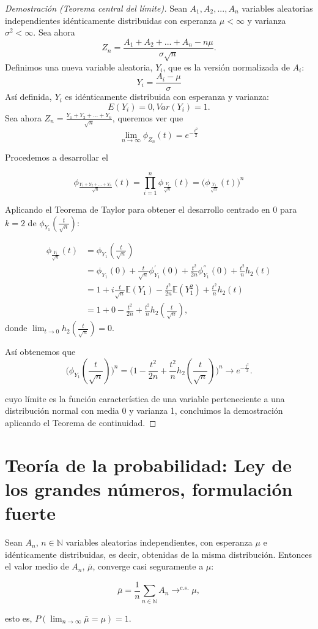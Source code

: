 \documentclass[../proyecto.tex]{memoir}
\begin{document}
\begin{proof}[Demostración (Teorema central del límite)]

Sean $A_{1},A_{2},...,A_{n}$ variables aleatorias independientes idénticamente distribuidas con esperanza $\mu < \infty$ y varianza $\sigma^2< \infty$.
Sea ahora $$
Z_{n} = \frac{A_{1}+A_{2}+...+A_{n}-n\mu }{\sigma \sqrt{n}}.
$$
Definimos una nueva variable aleatoria, $Y_i$, que es la versión normalizada de $A_i$:$$
Y_i=\frac{A_i-\mu}{\sigma}
$$
Así definida, $Y_i$ es idénticamente distribuida con esperanza y varianza: $$
E(Y_{i}) = 0,  Var(Y_{i})=1.
$$
Sea ahora $Z_n = \frac{Y_1+Y_2+...+Y_n}{\sqrt{n}}$, queremos ver que $$
\lim_{n \to \infty} \phi_{Z_{n}}(t)=e^{-\frac{t^{2}}{2}}
$$

Procedemos a desarrollar el

$$
\phi_{\frac{Y_1+Y_2+...+Y_n}{\sqrt{n}}}(t) = \prod_{i=1}^{n} \phi_{\frac{Y_i}{\sqrt{n}}} (t) = \big(\phi_{\frac{Y_1}{\sqrt{n}}}(t) \big)^n
$$

Aplicando el Teorema de Taylor para obtener el desarrollo centrado en 0 para $k=2$ de $\phi_{Y_1}(\frac{t}{\sqrt{n}})$: 

\begin{align*}
\phi_{\frac{Y_1}{\sqrt{n}}}(t) &= \phi_{Y_1}(\frac{t}{\sqrt{n}}) \\
  &= \phi_{Y_1}(0) + \frac{t}{\sqrt{n}}\phi_{Y_1}^{'}(0) + \frac{t^2}{2n}\phi_{Y_1}^{''}(0) + \frac{t^2}{n} h_2(t)\\
 &= 1 + i\frac{t}{\sqrt{n}}\mathds{E}(Y_1) - \frac{t^2}{2n}\mathds{E}(Y_1^2) + \frac{t^2}{n} h_2(t)\\
 &= 1 + 0 - \frac{t^2}{2n} + \frac{t^2}{n} h_2(\frac{t}{\sqrt{n}}),
\end{align*}
donde $\lim_{t\to 0} h_2(\frac{t}{\sqrt{n}}) = 0$.

Así obtenemos que $$
\big(\phi_{Y_1}(\frac{t}{\sqrt{n}}) \big)^n =\big( 1 - \frac{t^2}{2n} + \frac{t^2}{n} h_2(\frac{t}{\sqrt{n}}) \big)^n\longrightarrow e^{-\frac{t^2}{2}}.
$$

cuyo límite es la función característica de una variable perteneciente a una distribución normal con media 0 y varianza 1, concluimos la demostración aplicando el Teorema de continuidad.
\end{proof}

\section{Teoría de la probabilidad: Ley de los grandes números, formulación fuerte}
\begin{teorema} \label{teo_grandes_numeros}
Sean $A_n$, $n \in \mathds{N}$ variables aleatorias independientes, con esperanza $\mu$ e idénticamente distribuidas, es decir, obtenidas de la misma distribución. Entonces el valor medio de $A_n$, $\bar{\mu}$, converge casi seguramente a $\mu$:

$$
\bar{\mu}=\frac{1}{n}\sum_{n\in\mathds{N}} A_n \to^{c.s.} \mu,
$$

esto es, $P(\lim_{n\to\infty} \bar{\mu}=\mu) = 1$.

\end{teorema}
\end{document}
